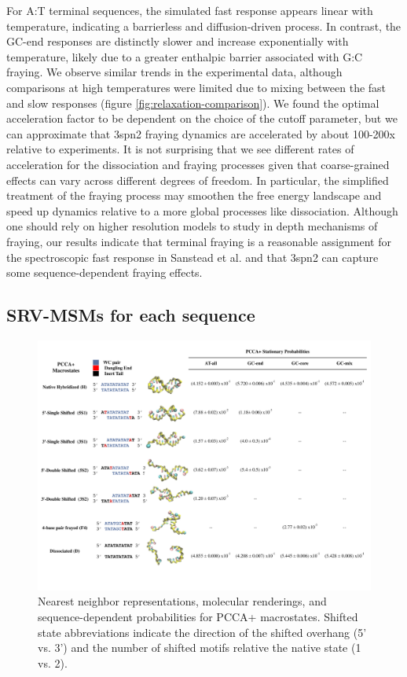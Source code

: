 \documentclass[journal=jpcbfk,manuscript=article]{achemso}
\begin{document}
For A:T terminal sequences, the simulated fast response appears linear with temperature, indicating a barrierless and diffusion-driven process. In contrast, the GC-end responses are distinctly slower and increase exponentially with temperature, likely due to a greater enthalpic barrier associated with G:C fraying. We observe similar trends in the experimental data, although comparisons at high temperatures were limited due to mixing between the fast and slow responses (figure \ref{fig:relaxation-comparison}). We found the optimal acceleration factor to be dependent on the choice of the cutoff parameter, but we can approximate that 3spn2 fraying dynamics are accelerated by about 100-200x relative to experiments. It is not surprising that we see different rates of acceleration for the dissociation and fraying processes given that coarse-grained effects can vary across different degrees of freedom. In particular, the simplified treatment of the fraying process may smoothen the free energy landscape and speed up dynamics relative to a more global processes like dissociation. Although one should rely on higher resolution models to study in depth mechanisms of fraying, our results indicate that terminal fraying is a reasonable assignment for the spectroscopic fast response in Sanstead et al. and that 3spn2 can capture some sequence-dependent fraying effects.

\subsection{SRV-MSMs for each sequence}

\begin{figure}[ht!]
	\begin{center}
        \includegraphics[width=160mm, 
        scale=1]{Fig3.pdf}
        \caption{Nearest neighbor representations, molecular renderings, and sequence-dependent probabilities for PCCA+ macrostates. Shifted state abbreviations indicate the direction of the shifted overhang (5' vs. 3') and the number of shifted motifs relative the native state (1 vs. 2).}
        \label{fig:allseq_table}
	\end{center}
\end{figure}
\end{document}
